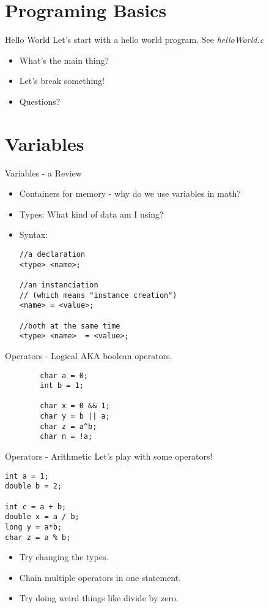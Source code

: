 \documentclass[main.tex]{subfiles}
\begin{document}
\section{Programing Basics} 
\label{sec:programing_basics}

\begin{frame}{Hello World}
	Let's start with a hello world program. See \textit{helloWorld.c}
	\begin{itemize}
		\item What's the main thing?
		\item Let's break something!
		\item Questions?
	\end{itemize}
\end{frame}

\section{Variables}
\label{sec:variables_scope_and_arrays}

\begin{frame}[fragile]{Variables - a Review}
	\begin{itemize}
		\item Containers for memory - why do we use variables in math?
		\item Types: What kind of data am I using?
		\item Syntax:
			\begin{lstlisting}
//a declaration
<type> <name>; 

//an instanciation 
// (which means "instance creation")
<name> = <value>;

//both at the same time
<type> <name>  = <value>;
			\end{lstlisting}
	\end{itemize}
\end{frame}

\begin{frame}[fragile]{Operators - Logical}
	AKA boolean operators.
	\begin{lstlisting}
		char a = 0;
		int b = 1;

		char x = 0 && 1;
		char y = b || a;
		char z = a^b;
		char n = !a;
	\end{lstlisting}
\end{frame}

\begin{frame}[fragile]{Operators - Arithmetic}
	Let's play with some operators!
	\begin{lstlisting}
int a = 1; 
double b = 2;

int c = a + b;
double x = a / b;
long y = a*b;
char z = a % b;
	\end{lstlisting}

	\begin{itemize}
		\item Try changing the types. 
		\item Chain multiple operators in one statement.
		\item Try doing weird things like divide by zero.
	\end{itemize}
\end{frame}
\end{document}
